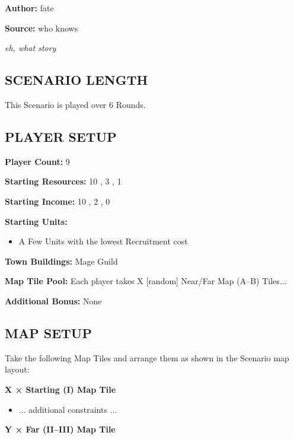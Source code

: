 
\begin{multicols*}{2}

\textbf{Author:} fate

\textbf{Source:} who knows

\textit{eh, what story}

\subsection*{\MakeUppercase{Scenario Length}}

This Scenario is played over 6 Rounds.

\subsection*{\MakeUppercase{Player Setup}}

\textbf{Player Count:} 9

\textbf{Starting Resources:} 10 , 3 , 1 

\textbf{Starting Income:} 10 , 2 , 0 

\textbf{Starting Units:}
\begin{itemize}
  \item A Few  Units with the lowest Recruitment cost
\end{itemize}

\textbf{Town Buildings:} Mage Guild

\textbf{Map Tile Pool:} Each player takes X [random] Near/Far Map (A--B) Tiles...

\textbf{Additional Bonus:} None

\subsection*{\MakeUppercase{Map Setup}}

Take the following Map Tiles and arrange them as shown in the Scenario map layout:

\textbf{X × Starting (I) Map Tile}
\begin{itemize}
    \item ... additional constraints ...
\end{itemize}

\textbf{Y × Far (II--III) Map Tile}


\end{multicols*}
